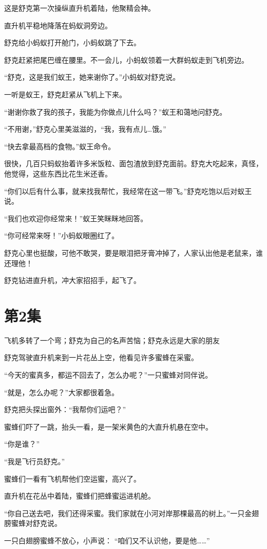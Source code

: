 \documentclass[a4paper,12pt,UTF8,twoside]{ctexbook}
\begin{document}
这是舒克第一次操纵直升机着陆，他聚精会神。

直升机平稳地降落在蚂蚁洞旁边。

舒克给小蚂蚁打开舱门，小蚂蚁跳了下去。

舒克赶紧把尾巴缠在腰里。不一会儿，小蚂蚁领着一大群蚂蚁走到飞机旁边。

“舒克，这是我们蚁王，她来谢你了。”小蚂蚁对舒克说。

一听是蚁王，舒克赶紧从飞机上下来。

“谢谢你救了我的孩子，我能为你做点儿什么吗？”蚁王和蔼地问舒克。

“不用谢，”舒克心里美滋滋的，“我，我有点儿…饿。”

“快去拿最高档的食物。”蚁王命令。

很快，几百只蚂蚁抬着许多米饭粒、面包渣放到舒克面前。舒克大吃起来，真怪，他觉得，这些东西比花生米还香。

“你们以后有什么事，就来找我帮忙，我经常在这一带飞。”舒克吃饱以后对蚁王说。

“我们也欢迎你经常来！”蚁王笑眯眯地回答。

“你可经常来呀！”小蚂蚁眼圈红了。

舒克心里也挺酸，可他不敢哭，要是眼泪把牙膏冲掉了，人家认出他是老鼠来，谁还理他！

舒克钻进直升机，冲大家招招手，起飞了。

\chapter{第2集}

飞机多转了一个弯；舒克为自己的名声苦恼；舒克永远是大家的朋友

舒克驾驶直升机来到一片花丛上空，他看见许多蜜蜂在采蜜。

“今天的蜜真多，都运不回去了，怎么办呢？”一只蜜蜂对同伴说。

“就是，怎么办呢？”大家都很着急。

舒克把头探出窗外：“我帮你们运吧？” 

蜜蜂们吓了一跳，抬头一看，是一架米黄色的大直升机悬在空中。

“你是谁？”

“我是飞行员舒克。”

蜜蜂们一看有飞机帮他们空运蜜，高兴了。

直升机在花丛中着陆，蜜蜂们把蜂蜜运进机舱。

“你自己送去吧，我们还得采蜜。我们家就在小河对岸那棵最高的树上。”一只金翅膀蜜蜂对舒克说。

一只白翅膀蜜蜂不放心，小声说：  “咱们又不认识他，要是他……”
\end{document}
